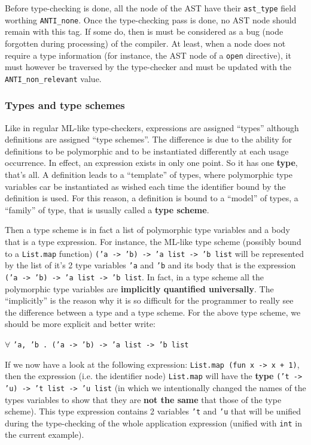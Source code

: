 Before type-checking is done, all the node of the AST have their
{\tt ast\_type} field worthing {\tt ANTI\_none}. Once the
type-checking pass is done, no AST node should remain with this
tag. If some do, then is must be considered as a bug (node forgotten
during processing) of the compiler. At least, when a node does not
require a type information (for instance, the AST node of a {\tt open}
directive), it must however be traversed by the type-checker and must
be updated with the {\tt ANTI\_non\_relevant} value.



\subsubsection{Types and type schemes}
\label{type-scheme}
Like in regular ML-like type-checkers, expressions are assigned
``types'' although definitions are assigned ``type schemes''. The
difference is due to the ability for definitions to be polymorphic and
to be instantiated differently at each usage occurrence. In effect, an
expression exists in only one point. So it has one {\bf type}, that's
all. A definition leads to a ``template'' of types, where polymorphic
type variables car be instantiated as wished each time the identifier
bound by the definition is used. For this reason, a definition is
bound to a ``model'' of types, a ``family'' of type, that is usually
called a {\bf type scheme}.

Then a type scheme is in fact a list of polymorphic type variables and
a body that is a type expression. For instance, the ML-like type scheme
(possibly bound to a {\tt List.map} function)
{\tt ('a -> 'b) -> 'a list -> 'b list} will be represented by the list
of it's 2 type variables {\tt 'a} and {\tt 'b} and its body that is
the expression {\tt ('a -> 'b) -> 'a list -> 'b list}. In fact, in a
type scheme all the polymorphic type variables are {\bf implicitly
quantified universally}. The ``implicitly'' is the reason why it is
so difficult for the programmer to really see the difference between a
type and a type scheme. For the above type scheme, we should be more
explicit and better write:

$\forall$ {\tt 'a, 'b . ('a -> 'b) -> 'a list -> 'b\ list}

If we now have a look at the following expression:
{\tt List.map (fun x -> x + 1)}, then the expression (i.e. the
identifier node) {\tt List.map} will have the {\bf type}
{\tt ('t -> 'u) -> 't list -> 'u list} (in which we intentionally
changed the names of the types variables to show that they are {\bf not
the same} that those of the type scheme). This type expression
contains 2 variables {\tt 't} and {\tt 'u} that will be unified during
the type-checking of the whole application expression (unified with
{\tt int} in the current example).

